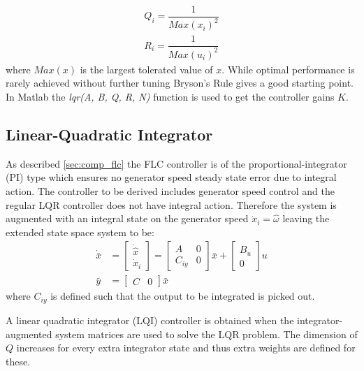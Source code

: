 \begin{equation}\label{eq:bryson}
	\begin{split}
		Q_i = \dfrac{1}{Max(x_i)^2} \\
		R_i = \dfrac{1}{Max(u_i)^2}
	\end{split}
\end{equation}
where $ Max(x) $ is the largest tolerated value of $ x $. While optimal performance is rarely achieved without further tuning Bryson's Rule gives a good starting point. In Matlab the \textit{lqr(A, B, Q, R, N)} function is used to get the controller gains $ K $.


\subsection{Linear-Quadratic Integrator} \label{sec:ctrl_lqi}
As described \cref{sec:comp_flc} the FLC controller is of the proportional-integrator (PI) type which ensures no generator speed steady state error due to integral action. The controller to be derived includes generator speed control and the regular LQR controller does not have integral action. Therefore the system is augmented with an integral state on the generator speed $ \dot x_i = \hat \omega $ leaving the extended state space system to be:
\begin{align} 
	\dot {\bar x} & = \begin{bmatrix} \dot{\hat x} \\ \dot x_i \end{bmatrix} = \begin{bmatrix} A &0 \\ C_{iy} & 0 \end{bmatrix} \bar x + \begin{bmatrix} B_u \\ 0 \end{bmatrix}  u \\
	\bar y & = \begin{bmatrix} C & 0 \end{bmatrix} \bar x
\end{align}
where $ C_{iy} $ is defined such that the output to be integrated is picked out. %

A linear quadratic integrator (LQI) controller is obtained when the integrator-augmented system matrices are used to solve the LQR problem. The dimension of $ Q $ increases for every extra integrator state and thus extra weights are defined for these. 


